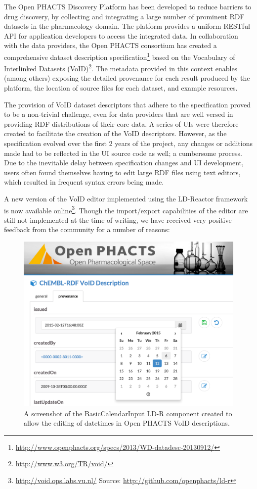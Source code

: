 \documentclass{acm_proc_article-sp}
\begin{document}
The Open PHACTS Discovery Platform has been developed to reduce barriers to drug discovery, by collecting and integrating a large number of prominent RDF datasets in the pharmacology domain. The platform provides a uniform RESTful API for application developers to access the integrated data.
In collaboration with the data providers, the Open PHACTS consortium has created a comprehensive dataset description specification\footnote{\url{http://www.openphacts.org/specs/2013/WD-datadesc-20130912/}} based on the Vocabulary of Interlinked Datasets (VoID)\footnote{\url{http://www.w3.org/TR/void/}}. The metadata provided in this context enables (among others) exposing the detailed provenance for each result produced by the platform, the location of source files for each dataset, and example resources.

The provision of VoID dataset descriptors that adhere to the specification proved to be a non-trivial challenge, even for data providers that are well versed in providing RDF distributions of their core data. A series of UIs were therefore created to facilitate the creation of the VoID descriptors. However, as the specification evolved over the first 2 years of the project, any changes or additions made had to be reflected in the UI source code as well; a cumbersome process. Due to the inevitable delay between specification changes and UI development, users often found themselves having to edit large RDF files using text editors, which resulted in frequent syntax errors being made.

A new version of the VoID editor implemented using the LD-Reactor framework is now available online\footnote{\url{http://void.ops.labs.vu.nl/} Source: \url{http://github.com/openphacts/ld-r}}. Though the  import/export capabilities of the editor are still not implemented at the time of writing, we have received very positive feedback from the community for a number of reasons:

\begin{figure}[tb] 
  \includegraphics[width=1\linewidth]{images/ops_ldr}
  \caption{A screenshot of the BasicCalendarInput LD-R component created to allow the editing of datetimes in Open PHACTS VoID descriptions.}
  \label{fig:opsLdr}
\end{figure}
\end{document}
